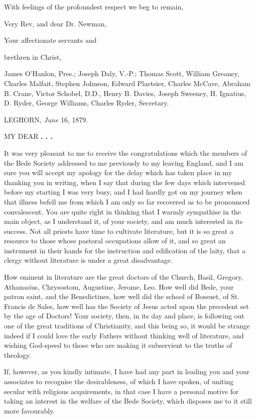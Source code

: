 With feelings of the profoundest respect we beg to remain,

Very Rev, and dear Dr. Newman,

Your affectionate servants and

brethren in Christ,

James O'Hanlon, Pres.; Joseph Daly, V.-P.; Thomas
Scott, William Greaney, Charles Malfait, Stephen Johnson, Edward
Plaetsier, Charles McCave, Abraham B. Crane, Victor Schobel, D.D.,
Henry B. Davies, Joseph Sweeney, H. Ignatius, D. Ryder, George
Williams, Charles Ryder, Secretary.


LEGHORN, \emph{June} 16, 1879.

MY DEAR \textbf{. . .}

It was very pleasant to me to receive the congratulations which the members of the Bede Society addressed to me previously to my
leaving England, and I am sure you will accept my apology for the
delay which has taken place in my thanking you in writing, when I say
that during the few days which intervened before my starting I was
very busy, and I had hardly got on my journey when that illness befell
me from which I am only so far recovered as to be pronounced
convalescent. You are quite right in thinking that I warmly sympathise
in the main object, as I understand it, of your society, and am much
interested in its success. Not all priests have time to cultivate
literature, but it is so great a resource to those whose pastoral
occupations allow of it, and so great an instrument in their hands for
the instruction and edification of the laity, that a clergy without
literature is under a great disadvantage.

How eminent in literature are the great doctors of the Church,
Basil, Gregory, Athanasius, Chrysostom, Augustine, Jerome, Leo. How
well did Bede, your patron saint, and the Benedictines, how well did
the school of Bossuet, of St. Francis de Sales, how well has the
Society of Jesus acted upon the precedent set by the age of
Doctors! Your society, then, in its day and place, is following out
one of the great traditions of Christianity, and this being so, it
would be strange indeed if I could love the early Fathers without
thinking well of literature, and wishing God-speed to those who are
making it subservient to the truths of theology.

If, however, as you kindly intimate, I have had any part in leading
you and your associates to recognise the desirableness, of which I
have spoken, of uniting secular with religious acquirements, in that
case I have a personal motive for taking an interest in the welfare of
the Bede Society, which disposes me to it still more favourably.

